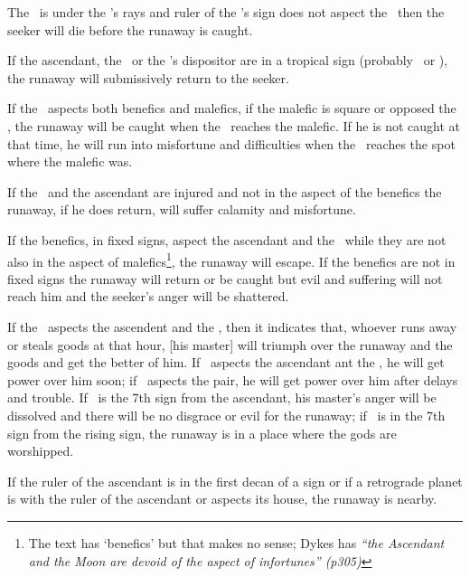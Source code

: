 The \Moon\, is under the \Sun's rays and ruler of the \Sun's sign does not aspect the \Moon\, then the seeker will die before the runaway is caught. 

If the ascendant, the \Moon\, or the \Moon's dispositor are in a tropical sign (probably \Cancer\, or \Capricorn), the runaway will submissively return to the seeker.

If the \Moon\, aspects both benefics and malefics, if the malefic is square or opposed the \Moon, the runaway will be caught when the \Moon\, reaches the malefic. If he is not caught at that time, he will run into misfortune and difficulties when the \Moon\, reaches the spot where the malefic was. 

If the \Moon\, and the ascendant are injured and not in the aspect of the benefics the runaway, if he does return, will suffer calamity and misfortune. 

If the benefics, in fixed signs, aspect the ascendant and the \Moon\, while they are not also in the aspect of malefics\footnote{The text has `benefics' but that makes no sense; Dykes has  \textsl{``the Ascendant and the Moon are devoid of the aspect of infortunes'' (p305)}}, the runaway will escape. If the benefics are not in fixed signs the runaway will return or be caught but evil and suffering will not reach him and the seeker's anger will be shattered.

If the \Sun\, aspects the ascendent and the \Moon, then it indicates that, whoever runs away or steals goods at that hour, [his master] will triumph over the runaway and the goods and get the better of him. If \Mars\, aspects the ascendant ant the \Moon, he will get power over him soon; if \Saturn\, aspects the pair, he will get power over him after delays and trouble.  If \Jupiter\, is the 7th sign from the ascendant, his master's anger will be dissolved and there will be no disgrace or evil for the runaway; if \Venus\, is in the 7th sign from the rising sign, the runaway is in a place where the gods are worshipped.

If the ruler of the ascendant is in the first decan of a sign or if a retrograde planet is with the ruler of the ascendant or aspects its house, the runaway is nearby. 

